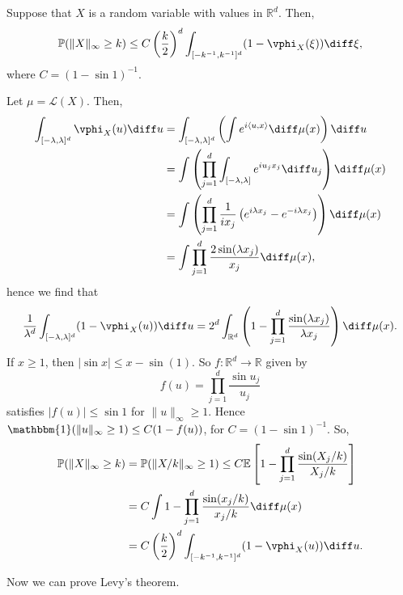 \documentclass[12pt]{article}
\begin{document}
\begin{lemma}
	Suppose that $X$ is a random variable with values in $\mathbb{R}^d$. Then,
	\[
		\mathbb{P}( \|X\|_\infty \geq k) \leq C \left( \frac k2\right)^d \int_{[-k^{-1}, k^{-1}]^{d}} (1 - \vphi_X(\xi)) \diff \xi,
	\]
	where $C = (1 - \sin 1)^{-1}$.
\end{lemma}

\begin{proofbox}
	Let $\mu = \mathcal{L}(X)$. Then,
	\begin{align*}
		\int_{[-\lambda, \lambda]^{d}} \vphi_X(u) \diff u &= \int_{[-\lambda, \lambda]^{d}} \left( \int e^{i \langle u, x \rangle} \diff \mu(x) \right) \diff u \\
								  &= \int \left( \prod_{j = 1}^{d} \int_{[-\lambda, \lambda]} e^{iu_j x_j} \diff u_j \right) \diff \mu(x) \\
								  &= \int \left( \prod_{j = 1}^d \frac{1}{i x_j} \left( e^{i \lambda x_j} - e^{-i \lambda x_j} \right) \right) \diff \mu(x) \\
								  &= \int \prod_{j = 1}^d \frac{2 \sin (\lambda x_j)}{x_j} \diff \mu(x),
	\end{align*}
	hence we find that
	\[
		\frac{1}{\lambda^{d}} \int_{[-\lambda, \lambda]^{d}} (1 - \vphi_X(u)) \diff u = 2^{d} \int_{\mathbb{R}^d} \left(1 - \prod_{j = 1}^d \frac{\sin(\lambda x_j)}{\lambda x_j} \right) \diff \mu(x).
	\]
	If $x \geq 1$, then $|\sin x| \leq x - \sin(1)$. So $f : \mathbb{R}^d \to \mathbb{R}$ given by
	\[
	f(u) = \prod_{j = 1}^d \frac{\sin u_j}{u_j}
	\]
	satisfies $|f(u)| \leq \sin 1$ for $\|u\|_\infty \geq 1$. Hence $\mathbbm{1}(\|u\|_\infty \geq 1) \leq C (1 - f(u))$, for $C = (1 - \sin 1)^{-1}$. So,
	\begin{align*}
		\mathbb{P}(\|X\|_\infty \geq k) &= \mathbb{P}(\|X/k\|_\infty \geq 1) \leq C \mathbb{E}\left[ 1 - \prod_{j= 1}^d \frac{\sin(X_j/k)}{X_j/k}\right]\\
						&= C \int 1 - \prod_{j = 1}^d \frac{\sin(x_j/k)}{x_j/k} \diff \mu(x) \\
						&= C \left( \frac{k}{2} \right)^d \int_{[-k^{-1}, k^{-1}]^{d}} (1 - \vphi_X(u)) \diff u.
	\end{align*}
\end{proofbox}

Now we can prove Levy's theorem.
\end{document}
